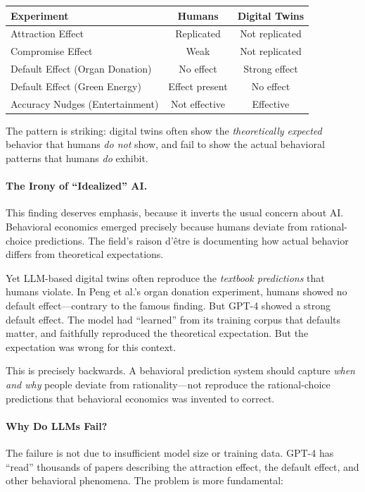 \begin{center}
\renewcommand{\arraystretch}{1.3}
\begin{tabular}{lcc}
\hline
\textbf{Experiment} & \textbf{Humans} & \textbf{Digital Twins} \\
\hline
Attraction Effect & Replicated & Not replicated \\
Compromise Effect & Weak & Not replicated \\
Default Effect (Organ Donation) & No effect & Strong effect \\
Default Effect (Green Energy) & Effect present & No effect \\
Accuracy Nudges (Entertainment) & Not effective & Effective \\
\hline
\end{tabular}
\end{center}

The pattern is striking: digital twins often show the \emph{theoretically
expected} behavior that humans \emph{do not} show, and fail to show the
actual behavioral patterns that humans \emph{do} exhibit.

\paragraph{The Irony of ``Idealized'' AI.}
This finding deserves emphasis, because it inverts the usual concern about AI.
Behavioral economics emerged precisely because humans deviate from
rational-choice predictions. The field's raison d'\^{e}tre is documenting
how actual behavior differs from theoretical expectations.

Yet LLM-based digital twins often reproduce the \emph{textbook predictions}
that humans violate. In Peng et al.'s organ donation experiment, humans
showed no default effect---contrary to the famous \citet{johnson2003}
finding. But GPT-4 showed a strong default effect. The model had ``learned''
from its training corpus that defaults matter, and faithfully reproduced
the theoretical expectation. But the expectation was wrong for this context.

This is precisely backwards. A behavioral prediction system should capture
\emph{when and why} people deviate from rationality---not reproduce the
rational-choice predictions that behavioral economics was invented to correct.

\paragraph{Why Do LLMs Fail?}
The failure is not due to insufficient model size or training data. GPT-4
has ``read'' thousands of papers describing the attraction effect, the
default effect, and other behavioral phenomena. The problem is more
fundamental:

